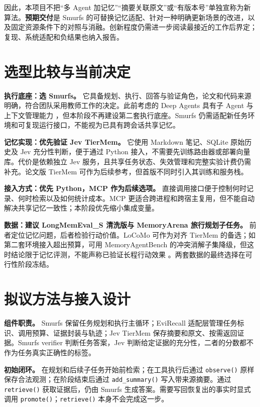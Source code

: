 \documentclass[UTF8,a4paper,zihao=5]{ctexart}
\begin{document}
因此，本项目不把“多 Agent 加记忆”“摘要关联原文”或“有版本号”单独宣称为新算法。\textbf{预期交付}是 Smurfs 的可替换记忆适配、针对一种明确更新场景的改进，以及固定资源条件下的对照与消融。创新程度仍需进一步阅读最接近的工作后界定；复现、系统适配和负结果也纳入报告。

\section{选型比较与当前决定}
\textbf{执行底座：选 Smurfs。} 它具备规划、执行、回答与验证角色，论文和代码来源明确，符合团队采用教师工作的决定。此前考虑的 Deep Agents 具有子 Agent 与上下文管理能力 \cite{deepagents2026}，但本阶段不再建设第二套执行底座。Smurfs 仍需适配新任务环境和可复现运行接口，不能视为已具有跨会话共享记忆。

\textbf{记忆实现：优先验证 Jev TierMem。} 它使用 Markdown 笔记、SQLite 原始历史及 Jev 充分性判断，便于通过 Python 接入，不需要先训练路由器或部署向量库。代价是依赖独立 Jev 服务，且共享任务状态、失效管理和完整实验计费仍需补充。论文版 TierMem 可作为后续参考，但首版不同时引入其训练和服务栈。

\textbf{接入方式：优先 Python，MCP 作为后续选项。} 直接调用接口便于控制何时记录、何时检索以及如何统计成本。MCP 更适合跨进程和跨宿主复用，但不能自动解决共享记忆一致性；本阶段优先缩小集成变量。

\textbf{数据：建议 LongMemEval\_S 清洗版与 MemoryArena 旅行规划子任务。} 前者定位记忆问题，后者检验行动价值。LoCoMo 可作为对齐 TierMem 的备选；如第二套环境接入超出预算，可用 MemoryAgentBench 的冲突消解子集降级，但这时结论限于记忆评测，不能声称已验证长程行动效果 \cite{memoryagentbench2026}。两套数据的最终选择在可行性阶段冻结。

\section{拟议方法与接入设计}
\textbf{组件职责。} Smurfs 保留任务规划和执行主循环；EviRecall 适配层管理任务标识、调用预算、证据封装与轨迹；Jev TierMem 保存摘要和原文、按需返回证据。Smurfs verifier 判断任务答案，Jev 判断给定证据的充分性，二者的分数都不作为任务真实正确性的标签。

\textbf{初始闭环。} 在规划和后续子任务开始前检索；在工具执行后通过 {\small\texttt{observe()}} 原样保存合法观测；在阶段结束后通过 {\small\texttt{add\_summary()}} 写入带来源摘要。通过 {\small\texttt{retrieve()}} 获取证据后，仍由 Smurfs 生成答案。需要写回恢复出的事实时显式调用 {\small\texttt{promote()}}；{\small\texttt{retrieve()}} 本身不会完成这一步。
\end{document}
